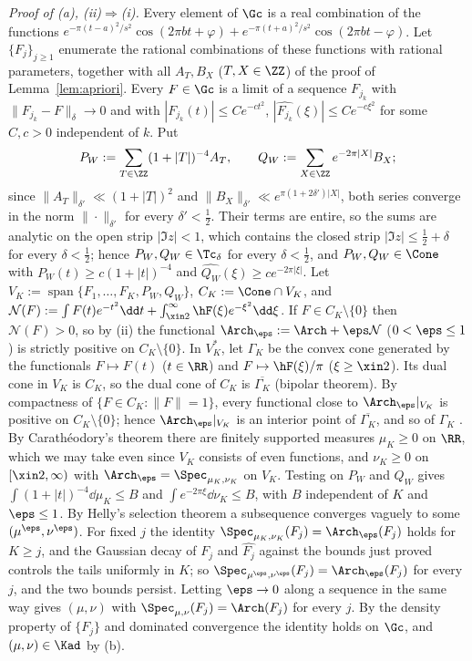 \emph{Proof of \textup{(a)}, \textup{(ii)}$\Rightarrow$\textup{(i)}.} Every element of $\Gc$ is a real combination of the functions
$e^{-\pi(t-a)^2/s^2}\cos(2\pi bt+\varphi)+e^{-\pi(t+a)^2/s^2}\cos(2\pi bt-\varphi)$. Let $\{F_j\}_{j\ge1}$ enumerate the rational combinations of
these functions with rational parameters, together with all $A_T,B_X$ ($T,X\in\ZZ$) of the proof of Lemma~\ref{lem:apriori}. Every
$F\in\Gc$ is a limit of a sequence $F_{j_k}$ with $\|F_{j_k}-F\|_\delta\to0$ and with $|F_{j_k}(t)|\le Ce^{-ct^2}$, $|\widehat{F_{j_k}}(\xi)|\le Ce^{-c\xi^2}$
for some $C,c>0$ independent of $k$. Put
\[
P_W:=\sum_{T\in\ZZ}(1+|T|)^{-4}A_T,\qquad Q_W:=\sum_{X\in\ZZ}e^{-2\pi|X|}B_X ;
\]
since $\|A_T\|_{\delta'}\ll(1+|T|)^2$ and $\|B_X\|_{\delta'}\ll e^{\pi(1+2\delta')|X|}$, both series converge in the norm $\|\cdot\|_{\delta'}$ for
every $\delta'<\frac12$. Their terms are entire, so the sums are analytic on the open strip $|\Im z|<1$, which contains the closed strip
$|\Im z|\le\frac12+\delta$ for every $\delta<\frac12$; hence $P_W,Q_W\in\Tc_\delta$ for every $\delta<\frac12$, and $P_W,Q_W\in\Cone$ with $P_W(t)\ge c(1+|t|)^{-4}$ and $\widehat{Q_W}(\xi)\ge ce^{-2\pi|\xi|}$. Let $V_K:=\operatorname{span}\{F_1,\dots,F_K,P_W,Q_W\}$,
$C_K:=\Cone\cap V_K$, and $\mathcal N(F):=\int F(t)e^{-t^2}\dd t+\int_{\xin2}^\infty\hF(\xi)e^{-\xi^2}\dd\xi$. If $F\in C_K\setminus\{0\}$ then $\mathcal N(F)>0$,
so by (ii) the functional $\Arch_\eps:=\Arch+\eps\mathcal N$ ($0<\eps\le1$) is strictly positive on $C_K\setminus\{0\}$. In $V_K^*$, let $\Gamma_K$ be
the convex cone generated by the functionals $F\mapsto F(t)$ ($t\in\RR$) and $F\mapsto\hF(\xi)/\pi$ ($\xi\ge\xin2$). Its dual cone in $V_K$ is
$C_K$, so the dual cone of $C_K$ is $\overline{\Gamma_K}$ (bipolar theorem). By compactness of $\{F\in C_K:\|F\|=1\}$, every functional close
to $\Arch_\eps|_{V_K}$ is positive on $C_K\setminus\{0\}$; hence $\Arch_\eps|_{V_K}$ is an interior point of $\overline{\Gamma_K}$, and so of
$\Gamma_K$ \cite[Theorem~6.3]{Roc70}. By Carath\'eodory's theorem \cite[Theorem~17.1]{Roc70} there are finitely supported measures
$\mu_K\ge0$ on $\RR$, which we may take even since $V_K$ consists of even functions, and $\nu_K\ge0$ on $[\xin2,\infty)$ with
$\Arch_\eps=\Spec_{\mu_K,\nu_K}$ on $V_K$. Testing on $P_W$ and $Q_W$ gives $\int(1+|t|)^{-4}\dd\mu_K\le B$ and $\int e^{-2\pi\xi}\dd\nu_K\le B$, with $B$
independent of $K$ and $\eps\le1$. By Helly's selection theorem a subsequence converges vaguely to some $(\mu^\eps,\nu^\eps)$. For fixed $j$ the
identity $\Spec_{\mu_K,\nu_K}(F_j)=\Arch_\eps(F_j)$ holds for $K\ge j$, and the Gaussian decay of $F_j$ and $\widehat{F_j}$ against the bounds just
proved controls the tails uniformly in $K$; so $\Spec_{\mu^\eps,\nu^\eps}(F_j)=\Arch_\eps(F_j)$ for every $j$, and the two bounds persist. Letting
$\eps\to0$ along a sequence in the same way gives $(\mu,\nu)$ with $\Spec_{\mu,\nu}(F_j)=\Arch(F_j)$ for every $j$. By the density property of
$\{F_j\}$ and dominated convergence the identity holds on $\Gc$, and $(\mu,\nu)\in\Kad$ by (b).

